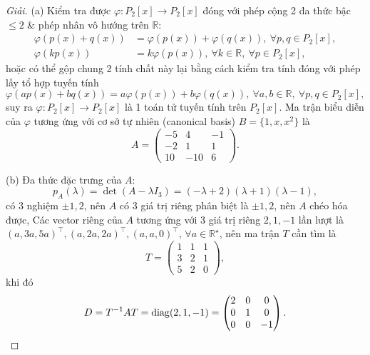 \documentclass{article}
\begin{document}
\begin{proof}[Giải]
	(a) Kiểm tra được $\varphi:P_2[x]\to P_2[x]$ đóng với phép cộng 2 đa thức bậc $\le2$ \& phép nhân vô hướng trên $\mathbb{R}$:
	\begin{align*}
		\varphi(p(x) + q(x)) &= \varphi(p(x)) + \varphi(q(x)),\ \forall p,q\in P_2[x],\\
		\varphi(kp(x)) &= k\varphi(p(x)),\ \forall k\in\mathbb{R},\ \forall p\in P_2[x],
	\end{align*}
	hoặc có thể gộp chung 2 tính chất này lại bằng cách kiểm tra tính đóng với phép lấy tổ hợp tuyến tính
	\begin{equation*}
		\varphi(ap(x) + bq(x)) = a\varphi(p(x)) + b\varphi(q(x)),\ \forall a,b\in\mathbb{R},\ \forall p,q\in P_2[x],
	\end{equation*}
	suy ra $\varphi:P_2[x]\to P_2[x]$ là 1 toán tử tuyến tính trên $P_2[x]$. Ma trận biểu diễn của $\varphi$ tương ứng với cơ sở tự nhiên (canonical basis) $B = \{1,x,x^2\}$ là
	\begin{equation*}
		A = \begin{pmatrix}
			-5 & 4 & -1\\-2 & 1 & 1\\10 & -10 & 6
		\end{pmatrix}.
	\end{equation*}
	\item(b) Đa thức đặc trưng của $A$:
	\begin{equation*}
		p_A(\lambda) = \det(A - \lambda I_3) = (-\lambda + 2)(\lambda + 1)(\lambda - 1),
	\end{equation*}
	có 3 nghiệm $\pm1,2$, nên $A$ có 3 giá trị riêng phân biệt là $\pm1,2$, nên $A$ chéo hóa được, Các vector riêng của $A$ tương ứng với 3 giá trị riêng $2,1,-1$ lần lượt là $(a,3a,5a)^\top,(a,2a,2a)^\top,(a,a,0)^\top$, $\forall a\in\mathbb{R}^\star$, nên ma trận $T$ cần tìm là
	\begin{equation*}
		T = \begin{pmatrix}
			1 & 1 & 1\\3 & 2 & 1\\5 & 2 & 0
		\end{pmatrix},
	\end{equation*}
	khi đó
	\begin{equation*}
		D = T^{-1}AT = {\rm diag}(2,1,-1) = \begin{pmatrix}
			2 & 0 & 0\\0 & 1 & 0\\0 & 0 & -1
		\end{pmatrix}.

\end{equation*}
\end{proof}
\end{document}
